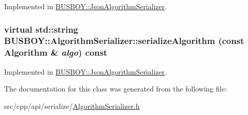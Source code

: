 Implemented in \hyperlink{classBUSBOY_1_1JsonAlgorithmSerializer_a569938b93fb3a067168f1ca098aa8ea0}{BUSBOY::JsonAlgorithmSerializer}.\hypertarget{classBUSBOY_1_1AlgorithmSerializer_a70b04ce235dc839571885a368bdb2192}{
\subsubsection[{serializeAlgorithm}]{\setlength{\rightskip}{0pt plus 5cm}virtual std::string BUSBOY::AlgorithmSerializer::serializeAlgorithm (const {\bf Algorithm} \& {\em algo}) const}}
\label{classBUSBOY_1_1AlgorithmSerializer_a70b04ce235dc839571885a368bdb2192}


Implemented in \hyperlink{classBUSBOY_1_1JsonAlgorithmSerializer_a2d8cf25399a01735700b37f9e894f4f8}{BUSBOY::JsonAlgorithmSerializer}.

The documentation for this class was generated from the following file:\begin{DoxyCompactItemize}
\item 
src/cpp/api/serialize/\hyperlink{AlgorithmSerializer_8h}{AlgorithmSerializer.h}\end{DoxyCompactItemize}
